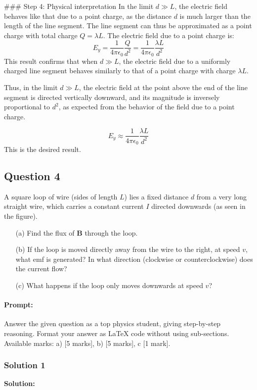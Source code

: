 \documentclass{article}
\begin{document}
### Step 4: Physical interpretation
In the limit \( d \gg L \), the electric field behaves like that due to a point charge, as the distance \( d \) is much larger than the length of the line segment. The line segment can thus be approximated as a point charge with total charge \( Q = \lambda L \). The electric field due to a point charge is:
\[
E_y = \frac{1}{4 \pi \epsilon_0} \frac{Q}{d^2} = \frac{1}{4 \pi \epsilon_0} \frac{\lambda L}{d^2}
\]
This result confirms that when \( d \gg L \), the electric field due to a uniformly charged line segment behaves similarly to that of a point charge with charge \( \lambda L \).

Thus, in the limit \( d \gg L \), the electric field at the point above the end of the line segment is directed vertically downward, and its magnitude is inversely proportional to \( d^2 \), as expected from the behavior of the field due to a point charge.

\[
E_y \approx \frac{1}{4 \pi \epsilon_0} \frac{\lambda L}{d^2}
\]
This is the desired result.


\subsection{Question 4}
A square loop of wire (sides of length $L$) lies a fixed distance $d$ from a very long straight wire, which carries a constant current $I$ directed downwards (as seen in the figure).

\begin{enumerate}
    \item[(a)] Find the flux of $\mathbf{B}$ through the loop.
    \item[(b)] If the loop is moved directly away from the wire to the right, at speed $v$, what emf is generated? In what direction (clockwise or counterclockwise) does the current flow?
    \item[(c)] What happens if the loop only moves downwards at speed $v$?
\end{enumerate}


\paragraph{Prompt: \\} 
Answer the given question as a top physics student, giving step-by-step reasoning. Format your answer as LaTeX code without using sub-sections. Available marks: a) [5 marks], b) [5 marks], c [1 mark].

\subsubsection{Solution 1}
\textbf{Solution:}
\end{document}
